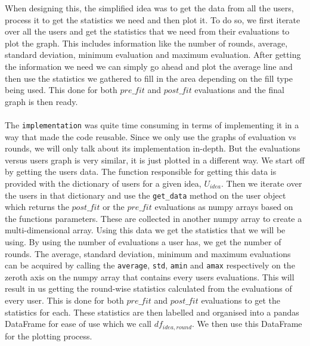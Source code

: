 \documentclass[12pt]{article}
\begin{document}
When designing this, the simplified idea was to get the data from all the users, process it to get the statistics we need and then plot it. To do so, we first iterate over all the users and get the statistics that we need from their evaluations to plot the graph. This includes information like the number of rounds, average, standard deviation, minimum evaluation and maximum evaluation. After getting the information we need we can simply go ahead and plot the average line and then use the statistics we gathered to fill in the area depending on the fill type being used. This done for both $pre\_fit$ and $post\_fit$ evaluations and the final graph is then ready. 
\\\\
The \texttt{implementation} was quite time consuming in terms of implementing it in a way that made the code reusable. Since we only use the graphs of evaluation vs rounds, we will only talk about its implementation in-depth. But the evaluations versus users graph is very similar, it is just plotted in a different way. We start off by getting the users data. The function responsible for getting this data is provided with the dictionary of users for a given idea, $U_{idea}$. Then we iterate over the users in that dictionary and use the \texttt{get\_data} method on the user object which returns the $post\_fit$ or the $pre\_fit$ evaluations as numpy arrays based on the functions parameters. These are collected in another numpy array to create a multi-dimensional array. Using this data we get the statistics that we will be using. By using the number of evaluations a user has, we get the number of rounds. The average, standard deviation, minimum and maximum evaluations can be acquired by calling the \texttt{average}, \texttt{std}, \texttt{amin} and \texttt{amax} respectively on the zeroth axis on the numpy array that contains every users evaluations. This will result in us getting the round-wise statistics calculated from the evaluations of every user. This is done for both $pre\_fit$ and $post\_fit$ evaluations to get the statistics for each. These statistics are then labelled and organised into a pandas DataFrame for ease of use which we call $df_{idea, round}$. We then use this DataFrame for the plotting process.
\\\\
\end{document}

